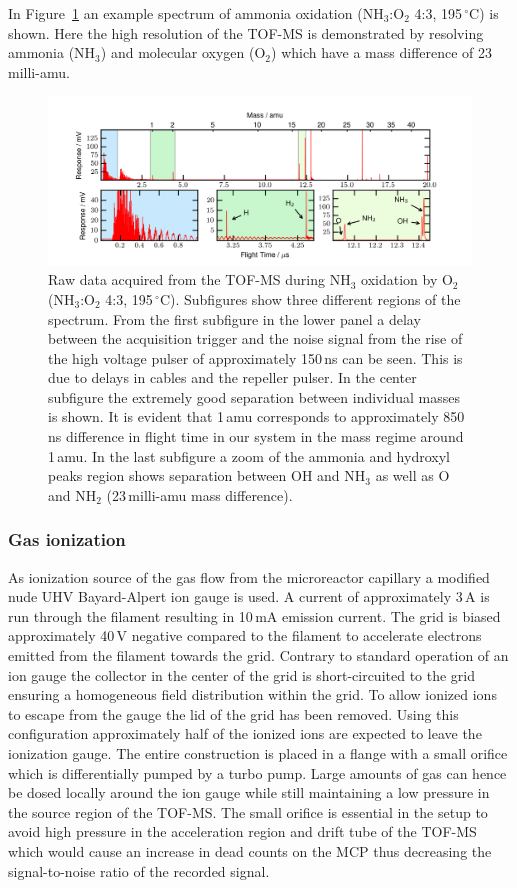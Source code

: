 \documentclass[aip,rsi]{revtex4-1}
\begin{document}
In Figure~\ref{fig:untreated_data} an example spectrum of ammonia oxidation (NH$_3$:O$_2$ 4:3, 195\,$^{\circ}$C) is shown. Here the high resolution of the TOF-MS is demonstrated by resolving ammonia (NH$_3$) and molecular oxygen (O$_2$) which have a mass difference of 23\,milli-amu.
\begin{figure}
 \includegraphics[width=16cm]{untreated_data.png}%
 \caption{Raw data acquired from the TOF-MS during NH$_3$ oxidation by O$_2$ (NH$_3$:O$_2$ 4:3, 195\,$^{\circ}$C). Subfigures show three different regions of the spectrum. From the first subfigure in the lower panel a delay between the acquisition trigger and the noise signal from the rise of the high voltage pulser of approximately 150\,ns can be seen. This is due to delays in cables and the repeller pulser. In the center subfigure the extremely good separation between individual masses is shown. It is evident that 1\,amu corresponds to approximately 850\,ns difference in flight time in our system in the mass regime around 1\,amu. In the last subfigure a zoom of the ammonia and hydroxyl peaks region shows separation between OH and NH$_3$ as well as O and NH$_2$  (23\,milli-amu mass difference).\label{fig:untreated_data}}%
\end{figure}

\subsubsection{Gas ionization}
As ionization source of the gas flow from the microreactor capillary a modified nude UHV Bayard-Alpert ion gauge is used. A current of approximately 3\,A is run through the filament resulting in 10\,mA emission current. The grid is biased approximately 40\,V negative compared to the filament to accelerate electrons emitted from the filament towards the grid. Contrary to standard operation of an ion gauge the collector in the center of the grid is short-circuited to the grid ensuring a homogeneous field distribution within the grid. To allow ionized ions to escape from the gauge the lid of the grid has been removed. Using this configuration approximately half of the ionized ions are expected to leave the ionization gauge\cite{Nottingham1955}. The entire construction is placed in a flange with a small orifice which is differentially pumped by a turbo pump. Large amounts of gas can hence be dosed locally around the ion gauge while still maintaining a low pressure in the source region of the TOF-MS. The small orifice is essential in the setup to avoid high pressure in the acceleration region and drift tube of the TOF-MS which would cause an increase in dead counts on the MCP thus decreasing the signal-to-noise ratio of the recorded signal.
\end{document}
